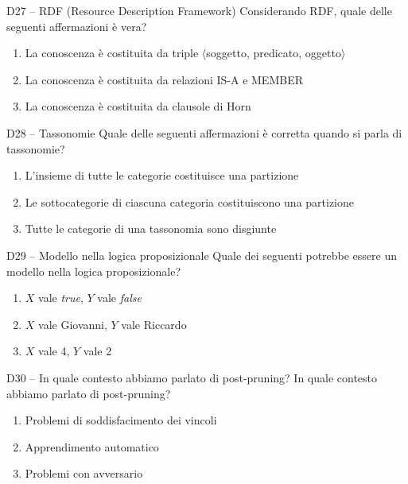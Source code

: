 \documentclass[12pt,a4paper]{article}
\begin{document}
\begin{domanda}{D27 -- RDF (Resource Description Framework)}
Considerando RDF, quale delle seguenti affermazioni è vera?
\begin{enumerate}[label=\alph*.]
  \item La conoscenza è costituita da triple $\langle$soggetto, predicato, oggetto$\rangle$
  \item La conoscenza è costituita da relazioni IS-A e MEMBER
  \item La conoscenza è costituita da clausole di Horn
\end{enumerate}
\end{domanda}

\begin{domanda}{D28 -- Tassonomie}
Quale delle seguenti affermazioni è corretta quando si parla di tassonomie?
\begin{enumerate}[label=\alph*.]
  \item L'insieme di tutte le categorie costituisce una partizione
  \item Le sottocategorie di ciascuna categoria costituiscono una partizione
  \item Tutte le categorie di una tassonomia sono disgiunte
\end{enumerate}
\end{domanda}

\begin{domanda}{D29 -- Modello nella logica proposizionale}
Quale dei seguenti potrebbe essere un modello nella logica proposizionale?
\begin{enumerate}[label=\alph*.]
  \item $X$ vale \textit{true}, $Y$ vale \textit{false}
  \item $X$ vale Giovanni, $Y$ vale Riccardo
  \item $X$ vale 4, $Y$ vale 2
\end{enumerate}
\end{domanda}

\begin{domanda}{D30 -- In quale contesto abbiamo parlato di post-pruning?}
In quale contesto abbiamo parlato di post-pruning?
\begin{enumerate}[label=\alph*.]
  \item Problemi di soddisfacimento dei vincoli
  \item Apprendimento automatico
  \item Problemi con avversario
\end{enumerate}
\end{domanda}
\end{document}
